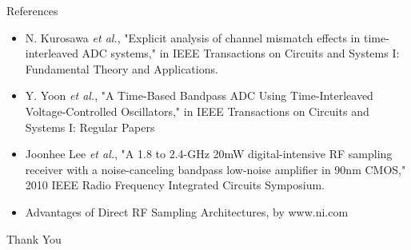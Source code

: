 \documentclass{beamer}
\begin{document}
\begin{frame}{References}
\begin{itemize}
	\item N. Kurosawa \textit{et al.}, "Explicit analysis of channel mismatch effects in time-interleaved ADC systems," in IEEE Transactions on Circuits and Systems I: Fundamental Theory and Applications.
	\item Y. Yoon \textit{et al.}, "A Time-Based Bandpass ADC Using Time-Interleaved Voltage-Controlled Oscillators," in IEEE Transactions on Circuits and Systems I: Regular Papers
	\item Joonhee Lee \textit{et al.}, "A 1.8 to 2.4-GHz 20mW digital-intensive RF sampling receiver with a noise-canceling bandpass low-noise amplifier in 90nm CMOS," 2010 IEEE Radio Frequency Integrated Circuits Symposium.
	\item Advantages of Direct RF Sampling Architectures, by www.ni.com
\end{itemize}
\end{frame}
\begin{frame}{}
\centering
 \Huge
 Thank You
\end{frame}
\end{document}
